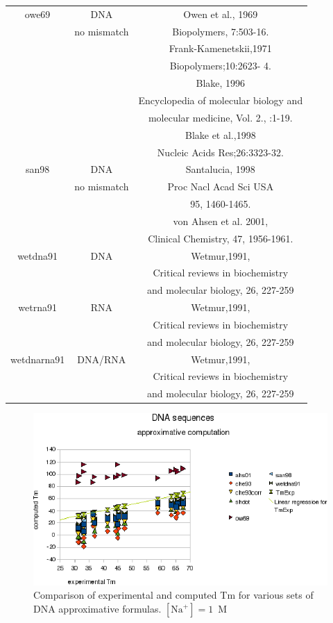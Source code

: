 \documentclass{article}
\begin{document}
\begin{table}[hc]
\begin{tabular}[h]{| c | c | c |}
 \hline
owe69 & DNA & Owen et al., 1969\\
 & no mismatch & Biopolymers, 7:503-16. \\
 & & Frank-Kamenetskii,1971 \\
 & & Biopolymers;10:2623- 4. \\
 & & Blake, 1996\\
 & & Encyclopedia of molecular biology and \\
 & & molecular medicine, Vol. 2., :1-19. \\
 & & Blake et al.,1998\\
 & & Nucleic Acids Res;26:3323-32. \\
 \hline
san98 & DNA & Santalucia, 1998\\
 & no mismatch & Proc Nacl Acad Sci USA \\
 & & 95, 1460-1465. \\
 & & von Ahsen et al. 2001, \\
 & & Clinical Chemistry, 47, 1956-1961. \\
 \hline
wetdna91 & DNA & Wetmur,1991, \\
 & & Critical reviews in biochemistry \\
 & & and molecular biology, 26, 227-259 \\
 \hline
wetrna91 & RNA & Wetmur,1991, \\
 & & Critical reviews in biochemistry \\
 & & and molecular biology, 26, 227-259 \\
 \hline
wetdnarna91 & DNA/RNA & Wetmur,1991, \\
 & & Critical reviews in biochemistry \\
 & & and molecular biology, 26, 227-259 \\
 \hline
\end{tabular}
\end{table}
 
\begin{figure}[h]
\includegraphics[width=1\linewidth]{images/DNAApproximativeMode}
\caption{Comparison of experimental and computed Tm for various sets of
 DNA approximative formulas. $[\mbox{Na}^+] = 1$~M}
\end{figure}   
\end{document}
